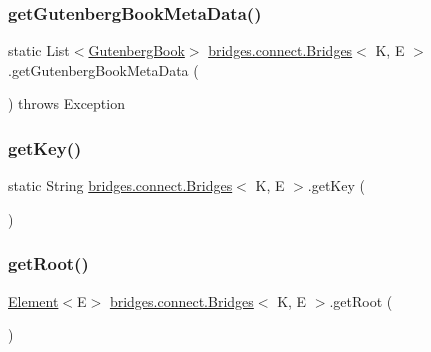 \subsubsection{\texorpdfstring{get\+Gutenberg\+Book\+Meta\+Data()}{getGutenbergBookMetaData()}}
{\footnotesize\ttfamily static List$<$\hyperlink{classbridges_1_1data__src__dependent_1_1_gutenberg_book}{Gutenberg\+Book}$>$ \hyperlink{classbridges_1_1connect_1_1_bridges}{bridges.\+connect.\+Bridges}$<$ K, E $>$.get\+Gutenberg\+Book\+Meta\+Data (\begin{DoxyParamCaption}{ }\end{DoxyParamCaption}) throws Exception\hspace{0.3cm}{\ttfamily [static]}}

\hypertarget{classbridges_1_1connect_1_1_bridges_a813a1783f7b547fdb964f8af87c66f4b}{}\label{classbridges_1_1connect_1_1_bridges_a813a1783f7b547fdb964f8af87c66f4b} 
\subsubsection{\texorpdfstring{get\+Key()}{getKey()}}
{\footnotesize\ttfamily static String \hyperlink{classbridges_1_1connect_1_1_bridges}{bridges.\+connect.\+Bridges}$<$ K, E $>$.get\+Key (\begin{DoxyParamCaption}{ }\end{DoxyParamCaption})\hspace{0.3cm}{\ttfamily [static]}}

\hypertarget{classbridges_1_1connect_1_1_bridges_ad46be93cba155fa93fd9082d9d813466}{}\label{classbridges_1_1connect_1_1_bridges_ad46be93cba155fa93fd9082d9d813466} 
\subsubsection{\texorpdfstring{get\+Root()}{getRoot()}}
{\footnotesize\ttfamily \hyperlink{classbridges_1_1base_1_1_element}{Element}$<$E$>$ \hyperlink{classbridges_1_1connect_1_1_bridges}{bridges.\+connect.\+Bridges}$<$ K, E $>$.get\+Root (\begin{DoxyParamCaption}{ }\end{DoxyParamCaption})}

